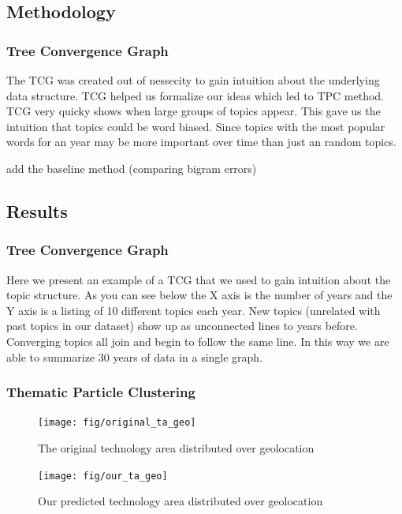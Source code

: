\documentclass[conference]{IEEEtran}
\begin{document}
\subsection{Methodology}

\subsubsection{Tree Convergence Graph}
The TCG was created out of nessecity to gain intuition about the underlying data structure. TCG helped us formalize our ideas which led to TPC method. TCG very quicky shows when large groups of topics appear. This gave us the intuition that topics could be word biased. Since topics with the most popular words for an year may be more important over time than just an random topics.     

add the baseline method (comparing bigram errors)


\subsection{Results}
\subsubsection{Tree Convergence Graph}
Here we present an example of a TCG that we used to gain intuition about the topic structure. As you can see below the X axis is the number of years and the Y axis is a listing of 10 different topics each year. New topics (unrelated with past topics in our dataset) show up as unconnected lines to years before. Converging topics all join and begin to follow the same line. In this way we are able to summarize 30 years of data in a single graph. 


\subsubsection{Thematic Particle Clustering}

\begin{figure}[ht]
	\begin{minipage}[b]{0.5\linewidth}
		\texttt{[image: fig/original\_ta\_geo]}
		\caption{The original technology area distributed over geolocation}
		\label{original_ta_geo}
	\end{minipage}
	\hspace{0.5cm}
	\begin{minipage}[b]{0.5\linewidth}
		\texttt{[image: fig/our\_ta\_geo]}
		\caption{Our predicted technology area distributed over geolocation}
		\label{our_ta_geo}
	\end{minipage}
\end{figure}
\end{document}
